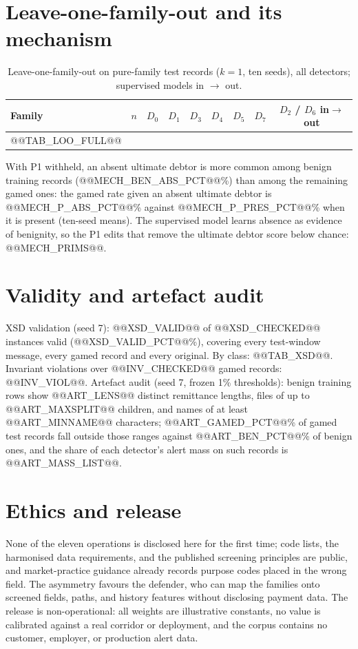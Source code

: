 \documentclass[conference]{IEEEtran}
\begin{document}
\section{Leave-one-family-out and its mechanism}
\begin{table}[t]\caption{Leave-one-family-out on pure-family test records ($k=1$, ten seeds), all detectors; supervised models in $\rightarrow$ out.}\centering\scriptsize\setlength{\tabcolsep}{3pt}
\begin{tabular}{@{}lcccccccc@{}}\toprule
Family & $n$ & $D_0$ & $D_1$ & $D_3$ & $D_4$ & $D_5$ & $D_7$ & $D_2$ / $D_6$ in$\rightarrow$out \\\midrule
@@TAB_LOO_FULL@@
\bottomrule\end{tabular}\end{table}
With P1 withheld, an absent ultimate debtor is more common among benign
training records (@@MECH_BEN_ABS_PCT@@\%) than among the remaining gamed
ones: the gamed rate given an absent ultimate debtor is
@@MECH_P_ABS_PCT@@\% against @@MECH_P_PRES_PCT@@\% when it is present (ten-seed
means). The supervised model learns absence as evidence of benignity, so the
P1 edits that remove the ultimate debtor score below chance:
@@MECH_PRIMS@@.

\section{Validity and artefact audit}
XSD validation (seed 7): @@XSD_VALID@@ of @@XSD_CHECKED@@ instances valid
(@@XSD_VALID_PCT@@\%), covering every test-window message, every gamed record
and every original. By class: @@TAB_XSD@@. Invariant violations over
@@INV_CHECKED@@ gamed records: @@INV_VIOL@@. Artefact audit (seed 7, frozen
1\% thresholds): benign training rows show @@ART_LENS@@ distinct remittance
lengths, files of up to @@ART_MAXSPLIT@@ children, and names of at least
@@ART_MINNAME@@ characters; @@ART_GAMED_PCT@@\% of gamed test records fall
outside those ranges against @@ART_BEN_PCT@@\% of benign ones, and the share
of each detector's alert mass on such records is @@ART_MASS_LIST@@.

\section{Ethics and release}
None of the eleven operations is disclosed here for the first time; code
lists, the harmonised data requirements, and the published screening
principles are public, and market-practice guidance already records purpose
codes placed in the wrong field. The asymmetry favours the defender, who can
map the families onto screened fields, paths, and history features without
disclosing payment data. The release is non-operational: all weights are
illustrative constants, no value is calibrated against a real corridor or
deployment, and the corpus contains no customer, employer, or production
alert data.
\end{document}
